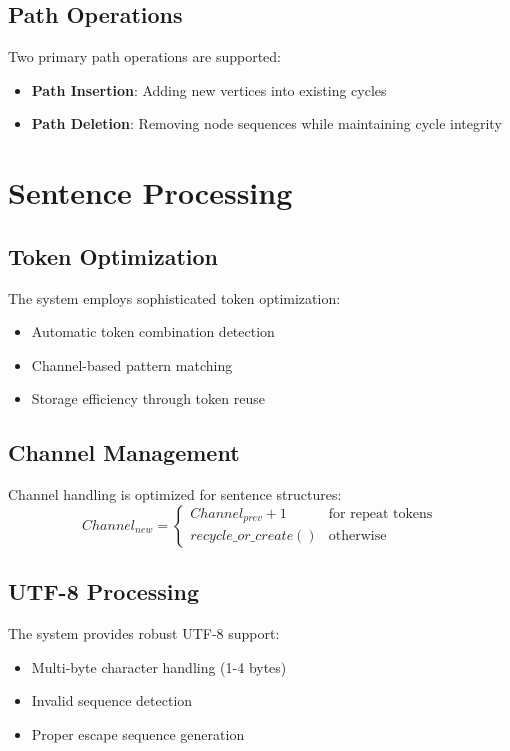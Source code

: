 \subsection{Path Operations}
Two primary path operations are supported:
\begin{itemize}
    \item \textbf{Path Insertion}: Adding new vertices into existing cycles
    \item \textbf{Path Deletion}: Removing node sequences while maintaining cycle integrity
\end{itemize}

\section{Sentence Processing}\label{Sec:Sentences}
\subsection{Token Optimization}
The system employs sophisticated token optimization:
\begin{itemize}
    \item Automatic token combination detection
    \item Channel-based pattern matching
    \item Storage efficiency through token reuse
\end{itemize}

\subsection{Channel Management}
Channel handling is optimized for sentence structures:
\begin{equation}
    Channel_{new} = \begin{cases}
        Channel_{prev} + 1 & \text{for repeat tokens} \\
        recycle\_or\_create() & \text{otherwise}
    \end{cases}
\end{equation}

\subsection{UTF-8 Processing}
The system provides robust UTF-8 support:
\begin{itemize}
    \item Multi-byte character handling (1-4 bytes)
    \item Invalid sequence detection
    \item Proper escape sequence generation
\end{itemize}


